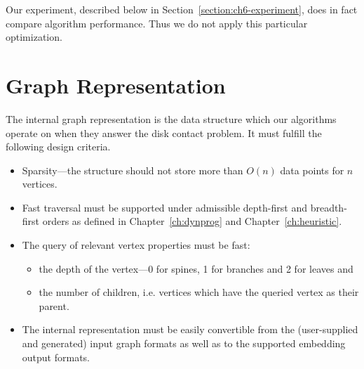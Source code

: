 Our experiment, described below in Section~\ref{section:ch6-experiment}, does in fact compare algorithm performance. Thus we do not apply this particular optimization.

\section{Graph Representation}
\label{section:ch6-graph-representation}

The internal graph representation is the data structure which our algorithms operate on when they answer the disk contact problem. It must fulfill the following design criteria.

\begin{itemize}
    \item Sparsity---the structure should not store more than $O(n)$ data points for $n$ vertices.
    \item Fast traversal must be supported under admissible depth-first and breadth-first orders as defined in Chapter~\ref{ch:dynprog} and Chapter~\ref{ch:heuristic}.
    \item The query of relevant vertex properties must be fast:
    \begin{itemize}
        \item the depth of the vertex---0 for spines, 1 for branches and 2 for leaves and
        \item the number of children, i.e. vertices which have the queried vertex as their parent.
    \end{itemize}
    \item The internal representation must be easily convertible from the (user-supplied and generated) input graph formats as well as to the supported embedding output formats.
\end{itemize}

